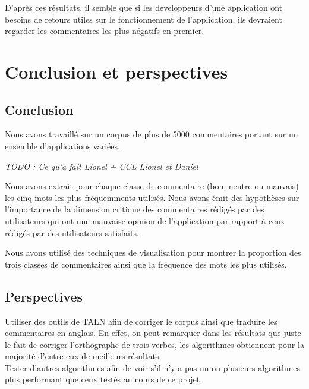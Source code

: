 \documentclass[a4paper, 11pt]{article}
\begin{document}
D'après ces résultats, il semble que si les developpeurs d'une application ont besoins de retours utiles sur le fonctionnement de l'application, ils devraient regarder les commentaires les plus négatifs en premier.

\section{Conclusion et perspectives}
\subsection{Conclusion}
Nous avons travaillé sur un corpus de plus de 5000 commentaires portant sur un ensemble d'applications variées. 

\textit{TODO : Ce qu'a fait Lionel + CCL Lionel et Daniel\\}

Nous avons extrait pour chaque classe de commentaire (bon, neutre ou mauvais) les cinq mots les plus fréquemments utilisés. Nous avons émit des hypothèses sur l'importance de la dimension critique des commentaires rédigés par des utilisateurs qui ont une mauvaise opinion de l'application par rapport à ceux rédigés par des utilisateurs satisfaits.

Nous avons utilisé des techniques de visualisation pour montrer la proportion des trois classes de commentaires ainsi que la fréquence des mots les plus utilisés.

\subsection{Perspectives}
Utiliser des outils de TALN afin de corriger le corpus ainsi que traduire les commentaires en anglais. En effet, on peut remarquer dans les résultats que juste le fait de corriger l'orthographe de trois verbes, les algorithmes obtiennent pour la majorité d'entre eux de meilleurs résultats.\\


Tester d'autres algorithmes afin de voir s'il n'y a pas un ou plusieurs algorithmes plus performant que ceux testés au cours de ce projet.
\end{document}
